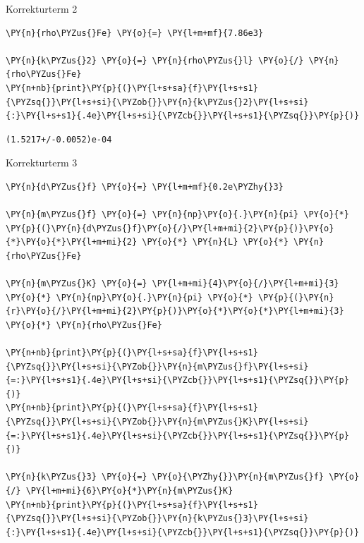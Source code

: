     Korrekturterm 2

    \begin{tcolorbox}[breakable, size=fbox, boxrule=1pt, pad at break*=1mm,colback=cellbackground, colframe=cellborder]
\begin{Verbatim}[commandchars=\\\{\}]
\PY{n}{rho\PYZus{}Fe} \PY{o}{=} \PY{l+m+mf}{7.86e3}

\PY{n}{k\PYZus{}2} \PY{o}{=} \PY{n}{rho\PYZus{}l} \PY{o}{/} \PY{n}{rho\PYZus{}Fe}
\PY{n+nb}{print}\PY{p}{(}\PY{l+s+sa}{f}\PY{l+s+s1}{\PYZsq{}}\PY{l+s+si}{\PYZob{}}\PY{n}{k\PYZus{}2}\PY{l+s+si}{:}\PY{l+s+s1}{.4e}\PY{l+s+si}{\PYZcb{}}\PY{l+s+s1}{\PYZsq{}}\PY{p}{)}
\end{Verbatim}
\end{tcolorbox}

    \begin{Verbatim}[commandchars=\\\{\}]
(1.5217+/-0.0052)e-04
    \end{Verbatim}

    Korrekturterm 3

    \begin{tcolorbox}[breakable, size=fbox, boxrule=1pt, pad at break*=1mm,colback=cellbackground, colframe=cellborder]
\begin{Verbatim}[commandchars=\\\{\}]
\PY{n}{d\PYZus{}f} \PY{o}{=} \PY{l+m+mf}{0.2e\PYZhy{}3}

\PY{n}{m\PYZus{}f} \PY{o}{=} \PY{n}{np}\PY{o}{.}\PY{n}{pi} \PY{o}{*} \PY{p}{(}\PY{n}{d\PYZus{}f}\PY{o}{/}\PY{l+m+mi}{2}\PY{p}{)}\PY{o}{*}\PY{o}{*}\PY{l+m+mi}{2} \PY{o}{*} \PY{n}{L} \PY{o}{*} \PY{n}{rho\PYZus{}Fe}

\PY{n}{m\PYZus{}K} \PY{o}{=} \PY{l+m+mi}{4}\PY{o}{/}\PY{l+m+mi}{3} \PY{o}{*} \PY{n}{np}\PY{o}{.}\PY{n}{pi} \PY{o}{*} \PY{p}{(}\PY{n}{r}\PY{o}{/}\PY{l+m+mi}{2}\PY{p}{)}\PY{o}{*}\PY{o}{*}\PY{l+m+mi}{3} \PY{o}{*} \PY{n}{rho\PYZus{}Fe}

\PY{n+nb}{print}\PY{p}{(}\PY{l+s+sa}{f}\PY{l+s+s1}{\PYZsq{}}\PY{l+s+si}{\PYZob{}}\PY{n}{m\PYZus{}f}\PY{l+s+si}{=:}\PY{l+s+s1}{.4e}\PY{l+s+si}{\PYZcb{}}\PY{l+s+s1}{\PYZsq{}}\PY{p}{)}
\PY{n+nb}{print}\PY{p}{(}\PY{l+s+sa}{f}\PY{l+s+s1}{\PYZsq{}}\PY{l+s+si}{\PYZob{}}\PY{n}{m\PYZus{}K}\PY{l+s+si}{=:}\PY{l+s+s1}{.4e}\PY{l+s+si}{\PYZcb{}}\PY{l+s+s1}{\PYZsq{}}\PY{p}{)}

\PY{n}{k\PYZus{}3} \PY{o}{=} \PY{o}{\PYZhy{}}\PY{n}{m\PYZus{}f} \PY{o}{/} \PY{l+m+mi}{6}\PY{o}{*}\PY{n}{m\PYZus{}K}
\PY{n+nb}{print}\PY{p}{(}\PY{l+s+sa}{f}\PY{l+s+s1}{\PYZsq{}}\PY{l+s+si}{\PYZob{}}\PY{n}{k\PYZus{}3}\PY{l+s+si}{:}\PY{l+s+s1}{.4e}\PY{l+s+si}{\PYZcb{}}\PY{l+s+s1}{\PYZsq{}}\PY{p}{)}
\end{Verbatim}
\end{tcolorbox}

